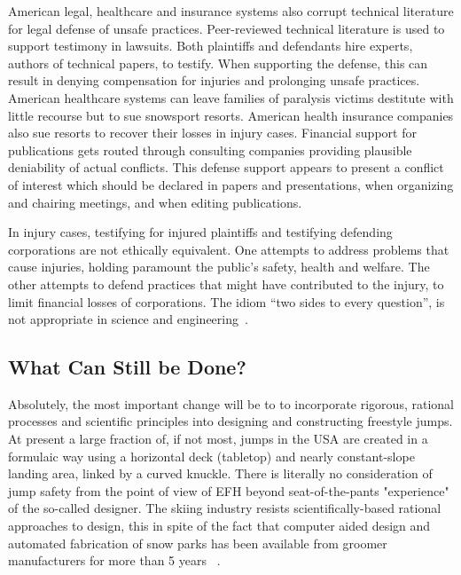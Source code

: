 \documentclass[smallextended]{svjour3}       %
\begin{document}
American legal, healthcare and insurance systems also corrupt technical literature
for legal defense of unsafe practices. Peer-reviewed technical literature is
used to support testimony in lawsuits. Both plaintiffs and defendants hire
experts, authors of technical papers, to testify.  When supporting the defense,
this can result in denying compensation for injuries and prolonging unsafe
practices. American healthcare systems can leave families of paralysis victims
destitute with little recourse but to sue snowsport resorts. American health
insurance companies also sue resorts to recover their losses in injury cases.
Financial support for publications gets routed through consulting companies
providing plausible deniability of actual conflicts. This defense support
appears to present a conflict of interest which should be declared in papers
and presentations, when organizing and chairing meetings, and when editing
publications.

In injury cases, testifying for injured plaintiffs and testifying defending
corporations are not ethically equivalent. One attempts to address
problems that cause injuries, holding paramount the public's safety, health and
welfare. The other attempts to defend practices that might have contributed to
the injury, to limit financial losses of corporations. The idiom ``two
sides to every question'', is not appropriate in science and
engineering~\cite[page 268]{Oreskes2010}.





\subsection{What Can Still be Done?}
\label{sec:action}
Absolutely, the most important change will be to to incorporate rigorous, rational  processes and scientific principles into designing and constructing freestyle jumps. At present a large fraction of, if not most, jumps in the USA are created in a formulaic way using a horizontal deck (tabletop) and nearly constant-slope landing area, linked by a curved knuckle. There is literally no consideration of jump safety from the point of view of EFH beyond seat-of-the-pants "experience" of the so-called designer. The skiing industry resists scientifically-based rational approaches to design, this in spite of the fact that computer aided design and automated fabrication of snow parks has been available from groomer manufacturers for more than 5 years ~\cite{Muigg2121,Prinoth2121}. 
\end{document}
